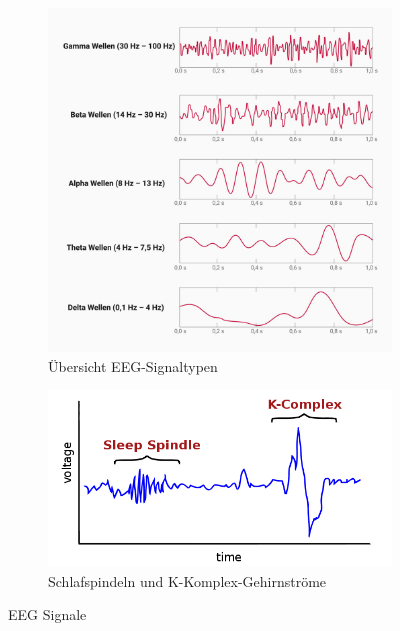 \documentclass[a4paper, 12pt]{article}
\begin{document}
\begin{figure}[htp]
    \centering
    \begin{subfigure}{0.5\textwidth}
        \centering
        \includegraphics[width=\textwidth]{eeg-baender_lg.jpg}
        \caption{Übersicht EEG-Signaltypen \cite{pic_eeg}}
        \label{EEG_pic}
    \end{subfigure}
    \hfill
    \begin{subfigure}{0.45\textwidth}
        \centering
        \includegraphics[width=\textwidth]{schlapfspindel_k_komplex.png}
        \caption{Schlafspindeln und K-Komplex-Gehirnströme \cite{pic_spin_k_komp}}
        \label{spind_k_pic}
    \end{subfigure}
    \caption{EEG Signale}
\end{figure}
\end{document}
